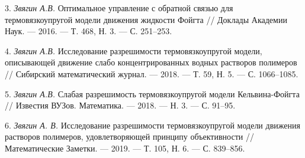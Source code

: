 3. {\it Звягин А.В.} Оптимальное управление с обратной связью для термовязкоупругой модели движения жидкости Фойгта // Доклады Академии Наук. --- 2016. --- Т. 468, Н. 3. --- С. 251--253.

4. {\it Звягин А.В.} Исследование разрешимости термовязкоупругой модели, описывающей движение слабо концентрированных водных растворов полимеров // Сибирский математический журнал. --- 2018. --- Т. 59, Н. 5. --- С. 1066--1085.

5. {\it Звягин А.В.} Слабая разрешимость термовязкоупругой модели Кельвина-Фойгта // Известия ВУЗов. Математика. --- 2018. --- Н. 3. --- С. 91--95.

6. {\it Звягин А. В.} Исследование разрешимости термовязкоупругой модели движения растворов полимеров, удовлетворяющей принципу объективности // Математические Заметки. --- 2019. --- Т. 105, Н. 6. --- С. 839--856.
